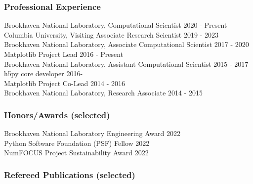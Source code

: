 \documentclass[12pt]{article}
\numberwithin{page}{section}
\begin{document}
\subsubsection*{Professional Experience}
Brookhaven National Laboratory, Computational Scientist \hfill 2020 - Present\\
Columbia University, Visiting Associate Research Scientist \hfill 2019 - 2023 \\
Brookhaven National Laboratory, Associate Computational Scientist \hfill 2017 - 2020\\
Matplotlib Project Lead \hfill 2016 - Present\\
Brookhaven National Laboratory, Assistant Computational Scientist \hfill 2015 - 2017\\
h5py core developer \hfill 2016-\\
Matplotlib Project Co-Lead \hfill 2014 - 2016\\
Brookhaven National Laboratory, Research Associate \hfill 2014 - 2015\\

\subsubsection*{Honors/Awards (selected)}
Brookhaven National Laboratory Engineering Award \hfill 2022\\
Python Software Foundation (PSF) Fellow \hfill 2022\\
NumFOCUS Project Sustainability Award \hfill 2022

\subsubsection*{Refereed Publications (selected)}
\end{document}
